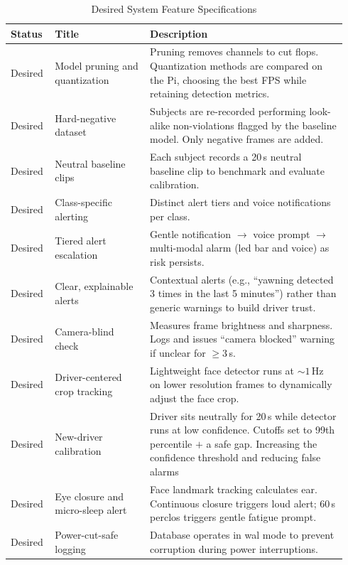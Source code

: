 \begin{table}[htbp]
\centering
\caption{Desired System Feature Specifications}
\label{tab:desired-features}
\footnotesize
\setlength{\tabcolsep}{4pt}
\renewcommand{\arraystretch}{1.15}
\begin{tabular}{|p{0.11\linewidth}|p{0.27\linewidth}|p{0.56\linewidth}|}
\hline
\textbf{Status} & \textbf{Title} & \textbf{Description} \\
\hline
Desired & Model pruning and quantization & Pruning removes channels to cut \glspl{flop}. Quantization methods are compared on the Pi, choosing the best FPS while retaining detection metrics. \\
\hline
Desired & Hard-negative dataset & Subjects are re-recorded performing look-alike non-violations flagged by the baseline model. Only negative frames are added. \\
\hline
Desired & Neutral baseline clips & Each subject records a 20\,s neutral baseline clip to benchmark and evaluate calibration. \\
\hline
Desired & Class-specific alerting & Distinct alert tiers and voice notifications per class. \\
\hline
Desired & Tiered alert escalation & Gentle notification $\rightarrow$ voice prompt $\rightarrow$ multi-modal alarm (\gls{led} bar and voice) as risk persists. \\
\hline
Desired & Clear, explainable alerts & Contextual alerts (e.g., ``yawning detected 3 times in the last 5 minutes'') rather than generic warnings to build driver trust. \\
\hline
Desired & Camera-blind check & Measures frame brightness and sharpness. Logs and issues ``camera blocked'' warning if unclear for $\ge 3$\,s.\\
\hline
Desired & Driver-centered crop tracking & Lightweight face detector runs at $\sim 1$\,Hz on lower resolution frames to dynamically adjust the face crop. \\
\hline
Desired & New-driver calibration & Driver sits neutrally for 20\,s while detector runs at low confidence. Cutoffs set to 99th percentile $+$ a safe gap. Increasing the confidence threshold and reducing false alarms \\
\hline
Desired & Eye closure and micro-sleep alert & Face landmark tracking calculates \gls{ear}. Continuous closure triggers loud alert; 60\,s \gls{perclos} triggers gentle fatigue prompt.\\
\hline
Desired & Power-cut-safe logging & Database operates in \gls{wal} mode to prevent corruption during power interruptions. \\

\end{tabular}
\end{table}
